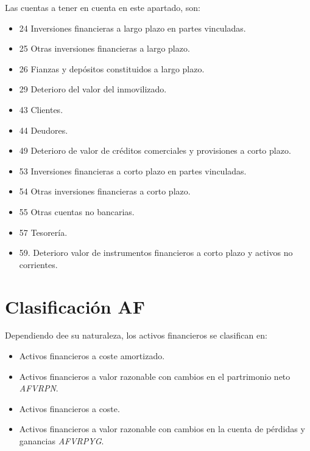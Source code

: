 Las cuentas a tener en cuenta en este apartado, son:
\begin{itemize}
    \item 24 Inversiones financieras a largo plazo en partes vinculadas.
    \item 25 Otras inversiones financieras a largo plazo.
    \item 26 Fianzas y depósitos constituidos a largo plazo.
    \item 29 Deterioro del valor del inmovilizado.
    \item 43 Clientes.
    \item 44 Deudores.
    \item 49 Deterioro de valor de créditos comerciales y provisiones a corto plazo.
    \item 53 Inversiones financieras a corto plazo en partes vinculadas.
    \item 54 Otras inversiones financieras a corto plazo.
    \item 55 Otras cuentas no bancarias.
    \item 57 Tesorería.
    \item 59. Deterioro valor de instrumentos financieros a corto plazo y activos no corrientes.
\end{itemize}

\section{Clasificación AF}

Dependiendo dee su naturaleza, los activos financieros se clasifican en:
\begin{itemize}
    \item Activos financieros a coste amortizado.
    \item Activos financieros a valor razonable con cambios en el partrimonio neto \textit{AFVRPN}.
    \item Activos financieros a coste.
    \item Activos financieros a valor razonable con cambios en la cuenta de pérdidas y ganancias \textit{AFVRPYG}.
\end{itemize}

